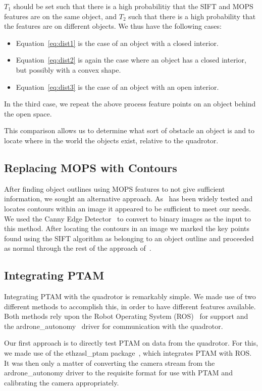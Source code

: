\documentclass{acmsiggraph}
\begin{document}
$T_1$ should be set such that there is a high probabilitiy that the SIFT and MOPS features are on the same object, and $T_2$ such that there is a high probability that the features are on different objects. We thus have the following cases:
\begin{itemize}
\item Equation~\ref{eq:dist1} is the case of an object with a closed interior.
\item Equation~\ref{eq:dist2} is again the case where an object has a closed interior, but possibly with a convex shape.
\item Equation~\ref{eq:dist3} is the case of an object with an open interior.
\end{itemize}
In the third case, we repeat the above process feature points on an object behind the open space.

This comparison allows us to determine what sort of obstacle an object is and to locate where in the world the objects exist, relative to the quadrotor.

\subsection{Replacing MOPS with Contours}
After finding object outlines using MOPS features to not give sufficient information, we sought an 
alternative approach.  As~\cite{suzuki1985} has been widely tested and locates contours within an image it appeared to be 
sufficient to meet our needs. We used the Canny Edge Detector~\cite{canny1986} to convert to binary images as the input to
this method.  After locating the contours in an image we marked the key points found using the SIFT algorithm as 
belonging to an object outline and proceeded as normal through the rest of the approach of~\cite{lee2011}.

\subsection{Integrating PTAM}
Integrating PTAM with the quadrotor is remarkably simple. We made use of two different methods to accomplish this, in order to have different features available. Both methods rely upon the Robot Operating System (ROS)~\cite{ros} for support and the ardrone\_autonomy~\cite{ardroneautonomy} driver for communication with the quadrotor.

Our first approach is to directly test PTAM on data from the quadrotor. For this, we made use of the ethzasl\_ptam package~\cite{ethzaslptam}, which integrates PTAM with ROS. It was then only a matter of converting the camera stream from the ardrone\_autonomy driver to the requisite format for use with PTAM and calibrating the camera appropriately.
\end{document}
